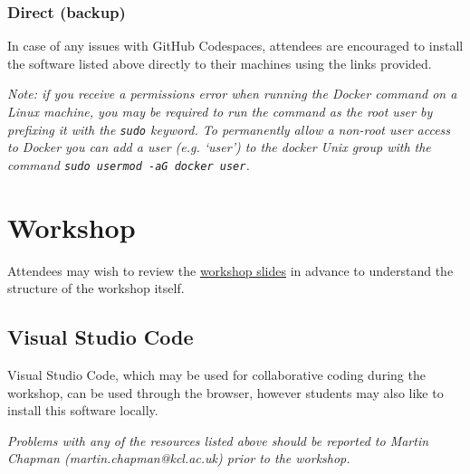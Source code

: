 \documentclass{article}
\begin{document}
\subsubsection{Direct (backup)}

In case of any issues with GitHub Codespaces, attendees are encouraged to install the software listed above directly to their machines using the links provided. 

\emph{Note: if you receive a permissions error when running the Docker command on a Linux machine, you may be required to run the command as the root user by prefixing it with the \texttt{sudo} keyword. 
To permanently allow a non-root user access to Docker you can add a user (e.g. `user') to the docker Unix group with the command \texttt{sudo usermod -aG docker user}.}

\section{Workshop}

Attendees may wish to review the \href{https://github.com/martinteaching/sustainability/blob/master/workshops/kcl/2025/workshop-slides.md}{workshop slides} in advance to understand the structure of the workshop itself.

\subsection{Visual Studio Code}

Visual Studio Code, which may be used for collaborative coding during the workshop, can be used through the browser, however students may also like to install this software locally.

\emph{Problems with any of the resources listed above should be reported to Martin Chapman (martin.chapman@kcl.ac.uk) prior to the workshop.}
\end{document}
